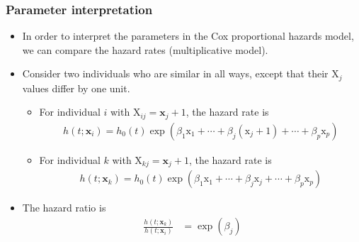 \documentclass{beamer}
\begin{document}
\begin{frame}
\frametitle{Parameter interpretation}
\begin{itemize}
\item In order to interpret the parameters in the Cox proportional hazards model, we can compare the hazard rates (multiplicative model). 
\item Consider two individuals who are similar in all ways, except that their $\mathrm{X}_j$ values differ by one unit. 
\begin{itemize}
\vp \vp
\item For individual $i$ with  $\mathrm{X}_{ij}=\mathbf{x}_j+1$, the hazard rate is  
\begin{align*}
h(t; \mathbf{x}_i) = h_0(t) \exp(\beta_1 \mathrm{x}_1 + \cdots + \beta_j (\mathrm{x}_j+1)+\cdots + \beta_p \mathrm{x}_p)
\end{align*}
\item For individual $k$ with $\mathrm{X}_{kj}=\mathbf{x}_j+1$, the hazard rate is 
\begin{align*}
h(t; \mathbf{x}_k) = h_0(t) \exp(\beta_1 \mathrm{x}_1 + \cdots + \beta_j \mathrm{x}_j+\cdots + \beta_p \mathrm{x}_p)
\end{align*}
\end{itemize}
\item The \alert{hazard ratio} is
\begin{align*}
\frac{h(t; \mathbf{x}_k)}{h(t; \mathbf{x}_i)} &= 
 \exp(\beta_j)
\end{align*}
\end{itemize}
\end{frame}
\end{document}
